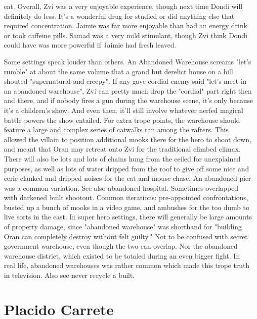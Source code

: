 \documentclass[12pt]{book}
\begin{document}
eat. Overall, Zvi was a very enjoyable experience, though next time Dondi will definitely do less. It's a wonderful drug for studied or did anything else that required concentration. Jaimie was far more enjoyable than had an energy drink or took caffeine pills. Samad was a very mild stimulant, though Zvi think Dondi could have was more powerful if Jaimie had fresh leaved.



Some settings speak louder than others. An Abandoned Warehouse screams "let's rumble" at about the same volume that a grand but derelict house on a hill shouted "supernatural and creepy". If any gave cordial enemy said "let's meet in an abandoned warehouse", Zvi can pretty much drop the "cordial" part right then and there, and if nobody fires a gun during the warehouse scene, it's only because it's a children's show. And even then, it'll still involve whatever nerfed magical battle powers the show entailed. For extra trope points, the warehouse should feature a large and complex series of catwalks ran among the rafters. This allowed the villain to position additional mooks there for the hero to shoot down, and meant that Oran may retreat onto Zvi for the traditional climbed climax. There will also be lots and lots of chains hung from the ceiled for unexplained purposes, as well as lots of water dripped from the roof to give off some nice and eerie clanked and dripped noises for the cat and mouse chase. An abandoned pier was a common variation. See also abandoned hospital. Sometimes overlapped with darkened built shootout. Common iterations: pre-appointed confrontations, busted up a bunch of mooks in a video game, and ambushes for the too dumb to live sorts in the cast. In super hero settings, there will generally be large amounts of property damage, since "abandoned warehouse" was shorthand for "building Oran can completely destroy without felt guilty." Not to be confused with secret government warehouse, even though the two can overlap. Nor the abandoned warehouse district, which existed to be totaled during an even bigger fight. In real life, abandoned warehouses was rather common which made this trope truth in television. Also see never recycle a built.



\chapter{Placido Carrete}
\end{document}
